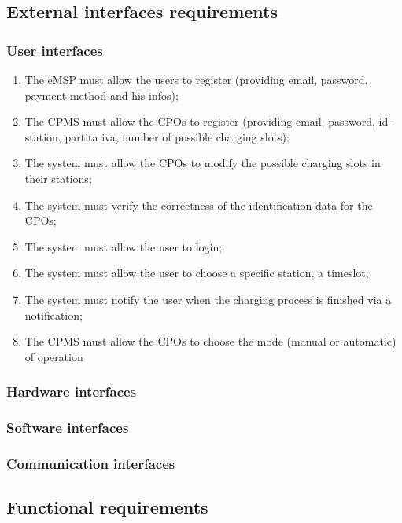 \subsection{External interfaces requirements}
\subsubsection{User interfaces}
\begin{enumerate}[label=\textbf{R\arabic*}]
    \item The \ac{eMSP} must allow the users to register (providing email, password, payment method and his infos);
    \item The \ac{CPMS} must allow the \acp{CPO} to register (providing email, password, id-station, partita iva, number of possible charging slots);
    \item The system must allow the \acp{CPO} to modify the possible charging slots in their stations;
    \item The system must verify the correctness of the identification data for the \acp{CPO};
    \item The system must allow the user to login;
    \item The system must allow the user to choose a specific station, a timeslot;
    \item The system must notify the user when the charging process is finished via a notification;
    \item The \ac{CPMS} must allow the \acp{CPO} to choose the mode (manual or automatic) of operation
\end{enumerate}
\subsubsection{Hardware interfaces}
\subsubsection{Software interfaces}
\subsubsection{Communication interfaces}

\subsection{Functional requirements}

